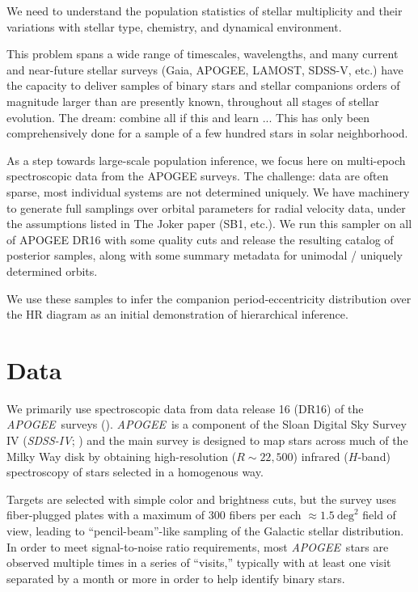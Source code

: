 \documentclass[modern]{aastex62}
\newcommand{\project}[1]{\textsl{#1}}
\newcommand{\acronym}[1]{{\small{#1}}}
\newcommand{\DR}{\acronym{DR}16}
\newcommand{\apogee}{\project{\acronym{APOGEE}}}
\newcommand{\sdssiv}{\project{\acronym{SDSS-IV}}}
\begin{document}
We need to understand the population statistics of stellar multiplicity and their variations with stellar type, chemistry, and dynamical environment.

This problem spans a wide range of timescales, wavelengths, and many current and near-future stellar surveys (Gaia, APOGEE, LAMOST, SDSS-V, etc.) have the capacity to deliver samples of binary stars and stellar companions orders of magnitude larger than are presently known, throughout all stages of stellar evolution.
The dream: combine all if this and learn ...
This has only been comprehensively done for a sample of a few hundred stars in solar neighborhood.

As a step towards large-scale population inference, we focus here on multi-epoch spectroscopic data from the APOGEE surveys.
The challenge: data are often sparse, most individual systems are not determined uniquely.
We have machinery to generate full samplings over orbital parameters for radial velocity data, under the assumptions listed in The Joker paper (SB1, etc.).
We run this sampler on all of APOGEE DR16 with some quality cuts and release the resulting catalog of posterior samples, along with some summary metadata for unimodal / uniquely determined orbits.

We use these samples to infer the companion period-eccentricity distribution over the HR diagram as an initial demonstration of hierarchical inference.

\section{Data} \label{sec:data}

We primarily use spectroscopic data from data release 16 (\DR) of the \apogee\ surveys (\citealt{Majewski:2017, Abolfathi:2017, XXXX:2019}).
\apogee\ is a component of the Sloan Digital Sky Survey IV (\sdssiv; \citealt{Gunn:2006, Blanton:2017}) and the main survey is designed to map stars across much of the Milky Way disk by obtaining high-resolution ($R \sim 22,500$) infrared ($H$-band) spectroscopy of stars selected in a homogenous way.

Targets are selected with simple color and brightness cuts, but the survey uses
fiber-plugged plates with a maximum of 300 fibers per each $\approx
1.5~\textrm{deg}^2$ field of view, leading to ``pencil-beam''-like sampling of
the Galactic stellar distribution.
In order to meet signal-to-noise ratio requirements, most \apogee\ stars are
observed multiple times in a series of ``visits,'' typically with at least one
visit separated by a month or more in order to help identify binary stars.
\end{document}
